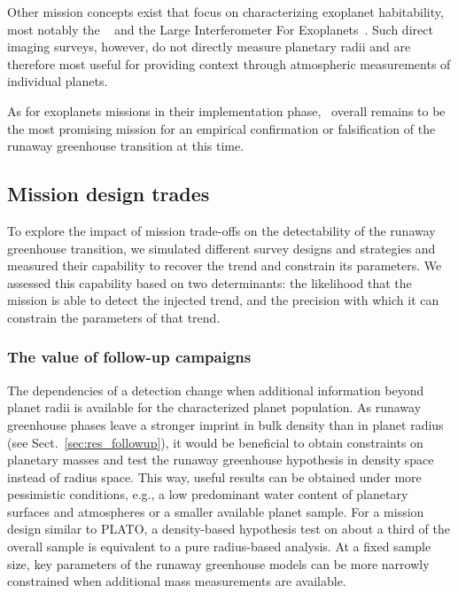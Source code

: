 \documentclass[twocolumn]{aastex631}
\begin{document}
Other mission concepts exist that focus on characterizing exoplanet habitability, most notably the \hwo~\citep{Gaudi2020c,LUVOIR2019} and the Large Interferometer For Exoplanets~\citep[\life,][]{Quanz2021}.
Such direct imaging surveys, however, do not directly measure planetary radii and are therefore most useful for providing context through atmospheric measurements of individual planets. 

As for exoplanets missions in their implementation phase, \plato\ overall remains to be the most promising mission for an empirical confirmation or falsification of the runaway greenhouse transition at this time.


\subsection{Mission design trades}\label{sec:mission-design-trades}
To explore the impact of mission trade-offs on the detectability of the runaway greenhouse transition, we simulated different survey designs and strategies and measured their capability to recover the trend and constrain its parameters.
We assessed this capability based on two determinants: the likelihood that the mission is able to detect the injected trend, and the precision with which it can constrain the parameters of that trend.

\subsubsection{The value of follow-up campaigns}
The dependencies of a detection change when additional information beyond planet radii is available for the characterized planet population.
As runaway greenhouse phases leave a stronger imprint in bulk density than in planet radius (see Sect.~\ref{sec:res_followup}), it would be beneficial to obtain constraints on planetary masses and test the runaway greenhouse hypothesis in density space instead of radius space.
This way, useful results can be obtained under more pessimistic conditions, e.g., a low predominant water content of planetary surfaces and atmospheres or a smaller available planet sample.
For a mission design similar to PLATO, a density-based hypothesis test on about a third of the overall sample is equivalent to a pure radius-based analysis.
At a fixed sample size, key parameters of the runaway greenhouse models can be more narrowly constrained when additional mass measurements are available.
\end{document}
